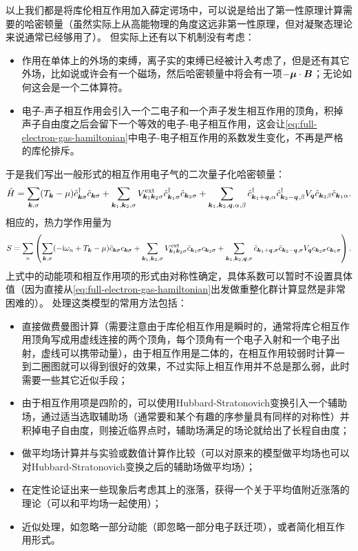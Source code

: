 \documentclass[hyperref, UTF8, a4paper]{ctexart}
\newcommand*{\ii}{\mathrm{i}}
\begin{document}
以上我们都是将库伦相互作用加入薛定谔场中，可以说是给出了第一性原理计算需要的哈密顿量（虽然实际上从高能物理的角度这远非第一性原理，但对凝聚态理论来说通常已经够用了）。
但实际上还有以下机制没有考虑：
\begin{itemize}
    \item 作用在单体上的外场的束缚，离子实的束缚已经被计入考虑了，但是还有其它外场，比如说或许会有一个磁场，然后哈密顿量中将会有一项$-\vb*{\mu} \cdot \vb*{B}$；无论如何这会是一个二体算符。
    \item 电子-声子相互作用会引入一个二电子和一个声子发生相互作用的顶角，积掉声子自由度之后会留下一个等效的电子-电子相互作用，这会让\eqref{eq:full-electron-gas-hamiltonian}中电子-电子相互作用的系数发生变化，不再是严格的库伦排斥。
\end{itemize}
于是我们写出一般形式的相互作用电子气的二次量子化哈密顿量：
\begin{equation}
    \hat{H} = \sum_{\vb*{k}, \sigma} (T_{\vb*{k}} - \mu) \hat{c}^\dagger_{\vb*{k} \sigma} \hat{c}_{\vb*{k} \sigma} 
    + \sum_{\vb*{k}_1, \vb*{k}_2, \sigma} V^\text{ext}_{\vb*{k}_1 \vb*{k}_2 \sigma} \hat{c}^\dagger_{\vb*{k}_1 \sigma} \hat{c}_{\vb*{k}_2 \sigma}
    + \sum_{\vb*{k}_1, \vb*{k}_2, \vb*{q}, \alpha, \beta} \hat{c}^\dagger_{\vb*{k}_1+\vb*{q}, \alpha} \hat{c}^\dagger_{\vb*{k}_2-\vb*{q}, \beta} V_{\vb*{q}} \hat{c}_{\vb*{k}_2 \beta} \hat{c}_{\vb*{k}_1 \alpha}. 
\end{equation}
相应的，热力学作用量为
\begin{equation}
    S = \sum_n \left( 
        \sum_{\vb*{k}, \sigma} (-\ii \omega_n + T_{\vb*{k}} - \mu) \bar{c}_{\vb*{k} \sigma} c_{\vb*{k} \sigma} 
        + \sum_{\vb*{k}_1, \vb*{k}_2, \sigma} V^\text{ext}_{\vb*{k}_1 \vb*{k}_2 \sigma} \bar{c}_{\vb*{k}_1 \sigma} c_{\vb*{k}_2 \sigma} 
        + \sum_{\vb*{k}_1, \vb*{k}_2, \vb*{q}, \sigma} \bar{c}_{\vb*{k}_1+\vb*{q}, \sigma} \bar{c}_{\vb*{k}_2-\vb*{q}, \sigma} V_{\vb*{q}} c_{\vb*{k}_2 \sigma} c_{\vb*{k}_1 \sigma} \right). 
\end{equation}
上式中的动能项和相互作用项的形式由对称性确定，具体系数可以暂时不设置具体值（因为直接从\eqref{eq:full-electron-gas-hamiltonian}出发做重整化群计算显然是非常困难的）。
处理这类模型的常用方法包括：
\begin{itemize}
    \item 直接做费曼图计算（需要注意由于库伦相互作用是瞬时的，通常将库仑相互作用顶角写成用虚线连接的两个顶角，每个顶角有一个电子入射和一个电子出射，虚线可以携带动量），由于相互作用是二体的，在相互作用较弱时计算一到二圈图就可以得到很好的效果，不过实际上相互作用并不总是那么弱，此时需要一些其它近似手段；
    \item 由于相互作用项是四阶的，可以使用Hubbard-Stratonovich变换引入一个辅助场，通过适当选取辅助场（通常要和某个有趣的序参量具有同样的对称性）并积掉电子自由度，则接近临界点时，辅助场满足的场论就给出了长程自由度；
    \item 做平均场计算并与实验或数值计算作比较（可以对原来的模型做平均场也可以对Hubbard-Stratonovich变换之后的辅助场做平均场）；
    \item 在定性论证出来一些现象后考虑其上的涨落，获得一个关于平均值附近涨落的理论（可以和平均场一起使用）；
    \item 近似处理，如忽略一部分动能（即忽略一部分电子跃迁项），或者简化相互作用形式。
\end{itemize}
\end{document}
